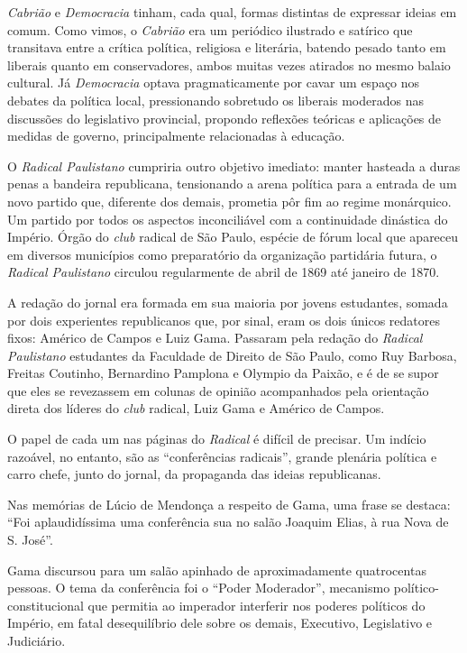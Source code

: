 \emph{Cabrião} e \emph{Democracia} tinham, cada qual, formas distintas
de expressar ideias em comum. Como vimos, o \emph{Cabrião} era um
periódico ilustrado e satírico que transitava entre a crítica política,
religiosa e literária, batendo pesado tanto em liberais quanto em
conservadores, ambos muitas vezes atirados no mesmo balaio cultural. Já
\emph{Democracia} optava pragmaticamente por cavar um espaço nos debates
da política local, pressionando sobretudo os liberais moderados nas
discussões do legislativo provincial, propondo reflexões teóricas e
aplicações de medidas de governo, principalmente relacionadas à
educação.

O \emph{Radical Paulistano} cumpriria outro objetivo imediato: manter
hasteada a duras penas a bandeira republicana, tensionando a arena
política para a entrada de um novo partido que, diferente dos demais,
prometia pôr fim ao regime monárquico. Um partido por todos os aspectos
inconciliável com a continuidade dinástica do Império. Órgão do
\emph{club} radical de São Paulo, espécie de fórum local que apareceu em
diversos municípios como preparatório da organização partidária futura,
o \emph{Radical Paulistano} circulou regularmente de abril de 1869 até
janeiro de 1870.

A redação do jornal era formada em sua maioria por jovens estudantes,
somada por dois experientes republicanos que, por sinal, eram os dois
únicos redatores fixos: Américo de Campos e Luiz Gama. Passaram pela
redação do \emph{Radical Paulistano} estudantes da Faculdade de Direito
de São Paulo, como Ruy Barbosa, Freitas Coutinho, Bernardino Pamplona e
Olympio da Paixão, e é de se supor que eles se revezassem em colunas de
opinião acompanhados pela orientação direta dos líderes do \emph{club}
radical, Luiz Gama e Américo de Campos.

O papel de cada um nas páginas do \emph{Radical} é difícil de precisar.
Um indício razoável, no entanto, são as ``conferências radicais'', grande
plenária política e carro chefe, junto do jornal, da propaganda das
ideias republicanas.

Nas memórias de Lúcio de Mendonça a respeito de Gama, uma frase se
destaca: ``Foi aplaudidíssima uma conferência sua no salão Joaquim Elias,
à rua Nova de S. José''.

Gama discursou para um salão apinhado de aproximadamente quatrocentas
pessoas. O tema da conferência foi o ``Poder Moderador'', mecanismo
político-constitucional que permitia ao imperador interferir nos poderes
políticos do Império, em fatal desequilíbrio dele sobre os demais,
Executivo, Legislativo e Judiciário.

